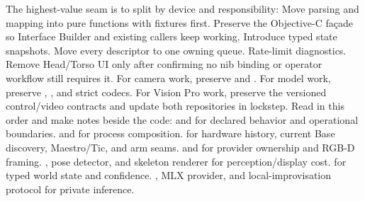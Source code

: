 {}The highest-value seam is to split  by device and responsibility:\markdownRendererInterblockSeparator
{}\markdownRendererInterblockSeparator
{}Move parsing and mapping into pure functions with fixtures first. Preserve the Objective-C façade so Interface Builder and existing callers keep working. Introduce typed state snapshots. Move every descriptor to one owning queue. Rate-limit diagnostics. Remove Head/Torso UI only after confirming no nib binding or operator workflow still requires it.\markdownRendererParagraphSeparator
{}For camera work, preserve  and . For model work, preserve , , and strict codecs. For Vision Pro work, preserve the versioned control/video contracts and update both repositories in lockstep.\markdownRendererInterblockSeparator
{}
\markdownRendererSectionEnd \markdownRendererSectionBegin
{}\markdownRendererInterblockSeparator
{}Read in this order and make notes beside the code:\markdownRendererInterblockSeparator
{}\markdownRendererOlBegin
{} and  for declared behavior and operational boundaries.\markdownRendererOlItemEnd 
{} and  for process composition.\markdownRendererOlItemEnd 
{} for hardware history, current Base discovery, Maestro/Tic, and arm seams.\markdownRendererOlItemEnd 
{} and  for provider ownership and RGB-D framing.\markdownRendererOlItemEnd 
{}, pose detector, and skeleton renderer for perception/display cost.\markdownRendererOlItemEnd 
{} for typed world state and confidence.\markdownRendererOlItemEnd 
{}, MLX provider, and local-improvisation protocol for private inference.\markdownRendererOlItemEnd 
